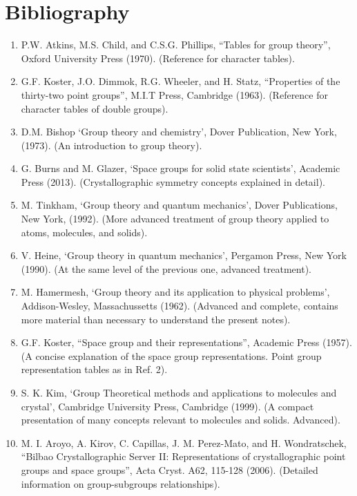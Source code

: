 \documentclass[12pt,a4paper]{article}
\begin{document}
\section{\color{coral}Bibliography}
\begin{enumerate}

\item
P.W. Atkins, M.S. Child, and C.S.G. Phillips, ``Tables for group theory'',
Oxford University Press (1970). (Reference for character tables).

\item
G.F. Koster, J.O. Dimmok, R.G. Wheeler, and H. Statz, ``Properties
of the thirty-two point groups'', M.I.T Press, Cambridge (1963). 
(Reference for character tables of double groups).

\item
D.M. Bishop `Group theory and chemistry', Dover Publication, New York, (1973).
(An introduction to group theory).

\item
G. Burns and M. Glazer, `Space groups for solid state scientists', Academic Press
(2013). (Crystallographic symmetry concepts explained in detail). 

\item
M. Tinkham, `Group theory and quantum mechanics', Dover Publications, New York,
(1992). (More advanced treatment of group theory applied to atoms, molecules,
and solids).

\item
V. Heine, `Group theory in quantum mechanics', Pergamon Press, New York (1990).
(At the same level of the previous one, advanced treatment).

\item
M. Hamermesh, `Group theory and its application to physical problems',
Addison-Wesley, Massachussetts (1962). 
(Advanced and complete, contains more material than necessary to
understand the present notes).

\item
G.F. Koster, ``Space group and their representations'', Academic Press (1957).
(A concise explanation of the space group representations. Point
group representation tables as in Ref. 2).

\item
S. K. Kim, `Group Theoretical methods and applications to molecules and crystal',
Cambridge University Press, Cambridge (1999). 
(A compact presentation of many concepts relevant to molecules and solids.
Advanced).

\item
M. I. Aroyo, A. Kirov, C. Capillas, J. M. Perez-Mato, and H. Wondratschek,
``Bilbao Crystallographic Server II: Representations of crystallographic 
point groups and space groups'', Acta Cryst. A62, 115-128 (2006).
(Detailed information on group-subgroups relationships).

\end{enumerate}
\end{document}
